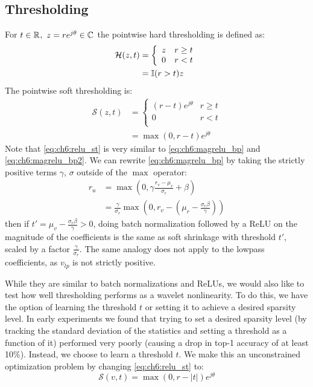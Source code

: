 \subsection{Thresholding}
For $t \in \mathbb{R}^{},\ z = re^{j\theta} \in \mathbb{C}^{}$ the pointwise hard thresholding is defined as:
\begin{align}
  \mathcal{H}(z, t) &= \left\{ \begin{array}{ll}
    z & r \geq t \\
    0 & r < t\\
  \end{array} \right. \\
  &= \mathbb{I}(r > t) z
\end{align}
The pointwise soft thresholding is:
\begin{align}
  \mathcal{S}(z, t) &= \left\{ \begin{array}{ll}
    (r-t)e^{j\theta} & r \geq t \\
    0 & r < t\\
  \end{array} \right. \\
  &= \max(0, r - t)e^{j\theta} \label{eq:ch6:relu_st}
\end{align}
Note that \eqref{eq:ch6:relu_st} is very similar to \eqref{eq:ch6:magrelu_bp} and \eqref{eq:ch6:magrelu_bp2}.
We can rewrite \eqref{eq:ch6:magrelu_bp} by taking the strictly positive terms
$\gamma$, $\sigma$ outside of the $\max$ operator:
\begin{align}
  r_u &= \max(0, \gamma \frac{r_v-\mu_r}{\sigma_r} + \beta) \\
      &= \frac{\gamma}{\sigma_r}\max\left(0, r_v - \left(\mu_r - \frac{\sigma_r\beta}{\gamma}\right)\right) \label{eq:ch6:bnrelu_soft}
\end{align}
then if $t' = \mu_v - \frac{\sigma_r\beta}{\gamma} > 0$, doing batch
normalization followed by a ReLU on the magnitude of the coefficients is the
same as soft shrinkage with threshold $t'$, scaled by a factor
$\frac{\gamma}{\sigma_r}$.  
The same analogy does not apply to the lowpass
coefficients, as $v_{lp}$ is not strictly positive. 

While they are similar to batch normalizations and ReLUs, we would also like 
to test how well thresholding performs as a wavelet nonlinearity.
To do this, we have the option of learning the threshold $t$ or setting it to achieve a
desired sparsity level. In early experiments we found that trying to set a
desired sparsity level (by tracking the standard deviation of the statistics
and setting a threshold as a function of it) performed very poorly (causing a
drop in top-1 accuracy of at least 10\%).
Instead, we choose to learn a threshold $t$. We make this an unconstrained
optimization problem by changing \eqref{eq:ch6:relu_st} to:
\begin{equation}
  \mathcal{S}(v, t) = \max(0, r-|t|)e^{j\theta}  \label{eq:ch6:relu_st2}
\end{equation}


